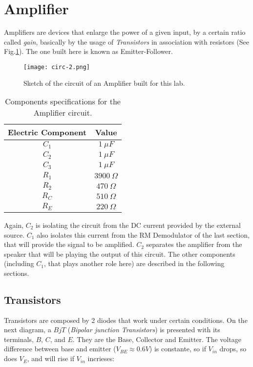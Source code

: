 \documentclass{article}
\begin{document}
\section{Amplifier}

Amplifiers are devices that enlarge the power of a given input, by a
certain ratio called \emph{gain}, basically by the usage of
\emph{Transistors} in association with resistors (See
Fig.\ref{circuit2}). The one built here is known as Emitter-Follower.

\begin{figure}[H]
\center
\texttt{[image: circ-2.png]}
\caption {Sketch of the circuit of an Amplifier built for this lab.} 
\label{circuit2}
\end{figure}

\begin{table}[H]
\center
\begin{tabular}{|c|c|}
\hline
Electric Component    &   Value    \\ 
\hline
$C_{1}$ & $1 \ \mu F$ \\ 
\hline
$C_{2}$ & $1 \ \mu F$ \\ 
\hline
$C_{3}$ & $1 \ \mu F$ \\ 
\hline
$R_{1}$ & $3900 \ \Omega$ \\ 
\hline
$R_{2}$ & $470 \ \Omega$ \\ 
\hline
$R_{C}$ & $510 \ \Omega$ \\ 
\hline
$R_{E}$ & $220 \ \Omega$ \\ 
\hline
\end{tabular}
\caption{Components specifications for the Amplifier circuit.} 
\label{tab:1}
\end{table}

Again, $C_{2}$ is isolating the circuit from the DC current
provided by the external source. $C_{1}$ also isolates this current from the
RM Demodulator of the last section, that will provide the signal to be
amplified. $C_{2}$ separates the amplifier from the speaker that will be
playing the output of this circuit. The other components (including
$C_{1}$, that plays another role here) are described
in the following sections.

\subsection{Transistors}

Transistors are composed by 2 diodes that work under certain
conditions. On the next diagram, a $BjT$ (\emph{Bipolar junction Transistors}) is presented with its terminals, $B$, $C$, and $E$. They are the Base, Collector and Emitter. The voltage difference between base and emitter ($V_{BE} \approx 0.6V$) is constante, so if $V_{in}$ drops, so does $V_{E}$, and will rise if $V_{in}$ incrieses:
\end{document}
